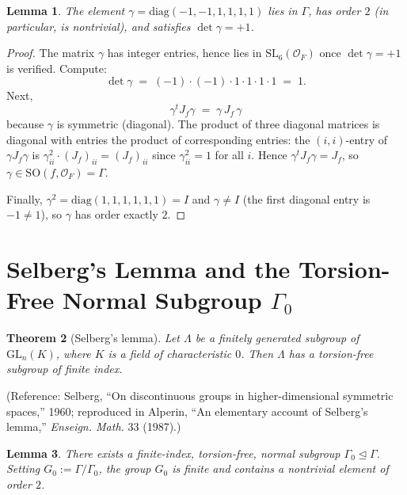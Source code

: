 \documentclass[12pt]{article}
\newtheorem{theorem}{Theorem}
\newtheorem{lemma}[theorem]{Lemma}
\theoremstyle{definition}
\begin{document}
\begin{lemma}\label{lem:torsion}
The element $\gamma=\mathrm{diag}(-1,-1,1,1,1,1)$ lies in $\Gamma$, has order $2$ (in particular, is nontrivial), and satisfies $\det\gamma=+1$.
\end{lemma}

\begin{proof}
The matrix $\gamma$ has integer entries, hence lies in $\mathrm{SL}_6(\mathcal{O}_F)$ once $\det\gamma=+1$ is verified. Compute:
\[
\det\gamma \;=\; (-1)\cdot(-1)\cdot 1\cdot 1\cdot 1\cdot 1 \;=\; 1.
\]
Next,
\[
\gamma^t J_f \gamma \;=\; \gamma\, J_f\,\gamma
\]
because $\gamma$ is symmetric (diagonal). The product of three diagonal matrices is diagonal with entries the product of corresponding entries: the $(i,i)$-entry of $\gamma J_f\gamma$ is $\gamma_{ii}^2 \cdot (J_f)_{ii}=(J_f)_{ii}$ since $\gamma_{ii}^2=1$ for all $i$. Hence $\gamma^t J_f\gamma=J_f$, so $\gamma\in\mathrm{SO}(f,\mathcal{O}_F)=\Gamma$.

Finally, $\gamma^2=\mathrm{diag}(1,1,1,1,1,1)=I$ and $\gamma\neq I$ (the first diagonal entry is $-1\neq 1$), so $\gamma$ has order exactly $2$.
\end{proof}

\section{Selberg's Lemma and the Torsion-Free Normal Subgroup $\Gamma_0$}\label{sec:selberg}

\begin{theorem}[Selberg's lemma]\label{thm:selberg}
Let $\Lambda$ be a finitely generated subgroup of $\mathrm{GL}_n(K)$, where $K$ is a field of characteristic $0$. Then $\Lambda$ has a torsion-free subgroup of finite index.
\end{theorem}

(Reference: Selberg, ``On discontinuous groups in higher-dimensional symmetric spaces,'' 1960; reproduced in Alperin, ``An elementary account of Selberg's lemma,'' \emph{Enseign. Math.} 33 (1987).)

\begin{lemma}\label{lem:Gamma0}
There exists a finite-index, torsion-free, normal subgroup $\Gamma_0 \trianglelefteq \Gamma$. Setting $G_0:=\Gamma/\Gamma_0$, the group $G_0$ is finite and contains a nontrivial element of order $2$.
\end{lemma}
\end{document}
